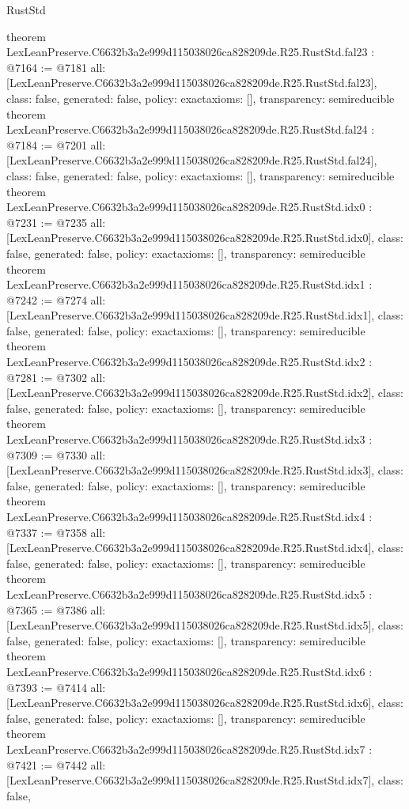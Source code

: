\begin{lexlean}{RustStd}
\begin{coremodule}
{}
theorem LexLeanPreserve.C6632b3a2e999d115038026ca828209de.R25.RustStd.fal23 : @7164 := @7181 {
  all: [LexLeanPreserve.C6632b3a2e999d115038026ca828209de.R25.RustStd.fal23],
  class: false,
  generated: false,
  policy: exact{axioms: []},
  transparency: semireducible
}
theorem LexLeanPreserve.C6632b3a2e999d115038026ca828209de.R25.RustStd.fal24 : @7184 := @7201 {
  all: [LexLeanPreserve.C6632b3a2e999d115038026ca828209de.R25.RustStd.fal24],
  class: false,
  generated: false,
  policy: exact{axioms: []},
  transparency: semireducible
}
theorem LexLeanPreserve.C6632b3a2e999d115038026ca828209de.R25.RustStd.idx0 : @7231 := @7235 {
  all: [LexLeanPreserve.C6632b3a2e999d115038026ca828209de.R25.RustStd.idx0],
  class: false,
  generated: false,
  policy: exact{axioms: []},
  transparency: semireducible
}
theorem LexLeanPreserve.C6632b3a2e999d115038026ca828209de.R25.RustStd.idx1 : @7242 := @7274 {
  all: [LexLeanPreserve.C6632b3a2e999d115038026ca828209de.R25.RustStd.idx1],
  class: false,
  generated: false,
  policy: exact{axioms: []},
  transparency: semireducible
}
theorem LexLeanPreserve.C6632b3a2e999d115038026ca828209de.R25.RustStd.idx2 : @7281 := @7302 {
  all: [LexLeanPreserve.C6632b3a2e999d115038026ca828209de.R25.RustStd.idx2],
  class: false,
  generated: false,
  policy: exact{axioms: []},
  transparency: semireducible
}
theorem LexLeanPreserve.C6632b3a2e999d115038026ca828209de.R25.RustStd.idx3 : @7309 := @7330 {
  all: [LexLeanPreserve.C6632b3a2e999d115038026ca828209de.R25.RustStd.idx3],
  class: false,
  generated: false,
  policy: exact{axioms: []},
  transparency: semireducible
}
theorem LexLeanPreserve.C6632b3a2e999d115038026ca828209de.R25.RustStd.idx4 : @7337 := @7358 {
  all: [LexLeanPreserve.C6632b3a2e999d115038026ca828209de.R25.RustStd.idx4],
  class: false,
  generated: false,
  policy: exact{axioms: []},
  transparency: semireducible
}
theorem LexLeanPreserve.C6632b3a2e999d115038026ca828209de.R25.RustStd.idx5 : @7365 := @7386 {
  all: [LexLeanPreserve.C6632b3a2e999d115038026ca828209de.R25.RustStd.idx5],
  class: false,
  generated: false,
  policy: exact{axioms: []},
  transparency: semireducible
}
theorem LexLeanPreserve.C6632b3a2e999d115038026ca828209de.R25.RustStd.idx6 : @7393 := @7414 {
  all: [LexLeanPreserve.C6632b3a2e999d115038026ca828209de.R25.RustStd.idx6],
  class: false,
  generated: false,
  policy: exact{axioms: []},
  transparency: semireducible
}
theorem LexLeanPreserve.C6632b3a2e999d115038026ca828209de.R25.RustStd.idx7 : @7421 := @7442 {
  all: [LexLeanPreserve.C6632b3a2e999d115038026ca828209de.R25.RustStd.idx7],
  class: false,
}
\end{coremodule}
\end{lexlean}
